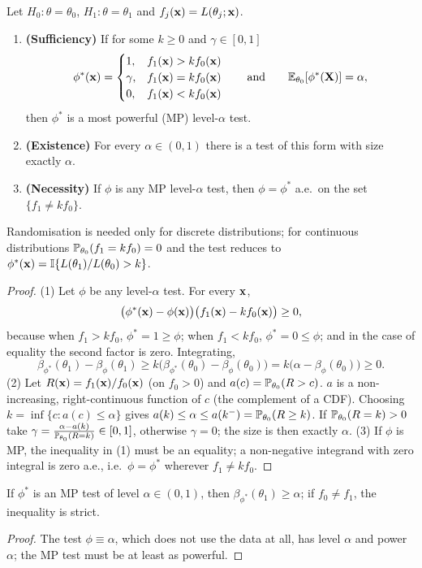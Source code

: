 \documentclass[main.tex]{subfiles}
\begin{document}
\begin{theorem}\label{thm:neyman-pearson}
Let $H_0: \theta = \theta_0$, $H_1: \theta = \theta_1$ and $f_j(\x)=L(\theta_j;\x)$.
\begin{enumerate}
  \item \textbf{(Sufficiency)} If for some $k\ge0$ and $\gamma\in[0,1]$
  \[
  \phi^*(\x)=\begin{cases}1, & f_1(\x)>kf_0(\x)\\ \gamma, & f_1(\x)=kf_0(\x)\\ 0, & f_1(\x)<kf_0(\x)\end{cases}\qquad\text{and}\qquad\E_{\theta_0}[\phi^*(\X)]=\alpha,
  \]
  then $\phi^*$ is a most powerful (MP) level-$\alpha$ test.
  \item \textbf{(Existence)} For every $\alpha\in(0,1)$ there is a test of this form with size exactly $\alpha$.
  \item \textbf{(Necessity)} If $\phi$ is any MP level-$\alpha$ test, then $\phi=\phi^*$ a.e.\ on the set $\{f_1\ne kf_0\}$.
\end{enumerate}
Randomisation is needed only for discrete distributions; for continuous distributions $\P_{\theta_0}(f_1=kf_0)=0$ and the test reduces to $\phi^*(\x) = \I\{L(\theta_1)/L(\theta_0) > k\}$.
\end{theorem}
\begin{proof}
(1) Let $\phi$ be any level-$\alpha$ test. For every $\x$,
\[
\big(\phi^*(\x)-\phi(\x)\big)\big(f_1(\x)-kf_0(\x)\big)\ge0,
\]
because when $f_1>kf_0$, $\phi^*=1\ge\phi$; when $f_1<kf_0$, $\phi^*=0\le\phi$; and in the case of equality the second factor is zero. Integrating,
\[
\beta_{\phi^*}(\theta_1)-\beta_\phi(\theta_1)\ge k\big(\beta_{\phi^*}(\theta_0)-\beta_\phi(\theta_0)\big)=k\big(\alpha-\beta_\phi(\theta_0)\big)\ge0 .
\]
(2) Let $R(\x)=f_1(\x)/f_0(\x)$ (on $f_0>0$) and $a(c)=\P_{\theta_0}(R>c)$. $a$ is a non-increasing, right-continuous function of $c$ (the complement of a CDF). Choosing $k=\inf\{c: a(c)\le\alpha\}$ gives $a(k)\le\alpha\le a(k^-)=\P_{\theta_0}(R\ge k)$. If $\P_{\theta_0}(R=k)>0$ take $\gamma=\frac{\alpha-a(k)}{\P_{\theta_0}(R=k)}\in[0,1]$, otherwise $\gamma=0$; the size is then exactly $\alpha$.
(3) If $\phi$ is MP, the inequality in (1) must be an equality; a non-negative integrand with zero integral is zero a.e., i.e.\ $\phi=\phi^*$ wherever $f_1\ne kf_0$.
\end{proof}

\begin{corollary}\label{cor:mp-yansiz}
If $\phi^*$ is an MP test of level $\alpha\in(0,1)$, then $\beta_{\phi^*}(\theta_1)\ge\alpha$; if $f_0\neq f_1$, the inequality is strict.
\end{corollary}
\begin{proof}
The test $\phi\equiv\alpha$, which does not use the data at all, has level $\alpha$ and power $\alpha$; the MP test must be at least as powerful.
\end{proof}
\end{document}
